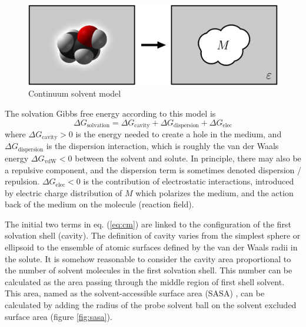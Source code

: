 \begin{figure}[h]
\begin{centering}
\includegraphics[width=0.72\columnwidth]{_figure/reaction-field-model_2}
\par\end{centering}
\caption{Continuum solvent model\label{fig:Reaction-field-model}}
\end{figure}

The solvation Gibbs free energy according to this model is
\begin{equation}
\Delta G_{\mathrm{solvation}}=\Delta G_{\mathrm{cavity}}+\Delta G_{\mathrm{dispersion}}+\Delta G_{\mathrm{elec}}\label{eq:cm}
\end{equation}
where $\Delta G_{\mathrm{cavity}}>0$ is the energy needed to create
a hole in the medium, and $\Delta G_{\mathrm{dispersion}}$ is the
dispersion interaction, which is roughly the van der Waals energy
$\Delta G_{\mathrm{vdW}}<0$ between the solvent and solute. In principle,
there may also be a repulsive component, and the dispersion term is
sometimes denoted dispersion / repulsion. $\Delta G_{\mathrm{elec}}<0$
is the contribution of electrostatic interactions, introduced by electric
charge distribution of $M$ which polarizes the medium, and the action
back of the medium on the molecule (reaction field). 

The initial two terms in eq. (\ref{eq:cm}) are linked to the configuration
of the first solvation shell (cavity). The definition of cavity varies
from the simplest sphere or ellipsoid to the ensemble of atomic surfaces
defined by the van der Waals radii in the solute. It is somehow reasonable
to consider the cavity area proportional to the number of solvent
molecules in the first solvation shell. This number can be calculated
as the area passing through the middle region of first shell solvent.
This area, named as the solvent-accessible surface area (SASA) \citep{SAS_1,SAS_2},
can be calculated by adding the radius of the probe solvent ball on
the solvent excluded surface area (figure \ref{fig:sasa}).

